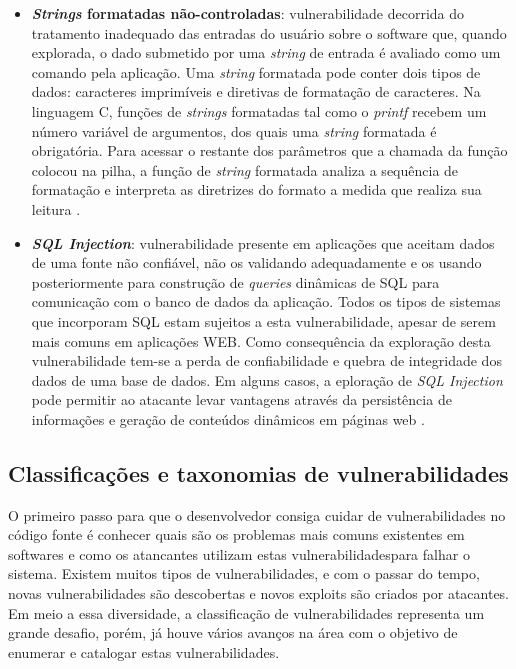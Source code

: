 \begin{itemize}
\item \textbf{\emph{Strings} formatadas não-controladas}: vulnerabilidade decorrida do tratamento inadequado das entradas do usuário sobre o software que, quando explorada, o dado submetido por uma \emph{string} de entrada é avaliado como um comando pela aplicação. Uma \emph{string} formatada pode conter dois tipos de dados: caracteres imprimíveis e diretivas de formatação de caracteres. Na linguagem C, funções de \emph{strings} formatadas tal como o \emph{printf} recebem um número variável de argumentos, dos quais uma \emph{string}  formatada é obrigatória. Para acessar o restante dos parâmetros que a chamada da função colocou na pilha, a função de \emph{string} formatada analiza a sequência de formatação e interpreta as diretrizes do formato a medida que realiza sua leitura \cite{lhee2002}.
\item \textbf{\emph{SQL Injection}}: vulnerabilidade presente em aplicações que aceitam dados de uma fonte não confiável, não os validando adequadamente e os usando posteriormente para construção de \emph{queries} dinâmicas de SQL para comunicação com o banco de dados da aplicação. Todos os tipos de sistemas que incorporam SQL estam sujeitos a esta vulnerabilidade, apesar de serem mais comuns em aplicações WEB. Como consequência da exploração desta vulnerabilidade tem-se a perda de confiabilidade e quebra de integridade dos dados de uma base de dados. Em alguns casos, a eploração de \emph{SQL Injection} pode permitir ao atacante levar vantagens através da persistência de informações e geração de conteúdos dinâmicos em páginas web \cite{uscert2012}.
\end{itemize}

\subsection{Classificações e taxonomias de vulnerabilidades}
O primeiro passo para que o desenvolvedor consiga cuidar de vulnerabilidades no código fonte é conhecer quais são os problemas mais comuns existentes em softwares e como os atancantes utilizam estas vulnerabilidadespara falhar o sistema. Existem muitos tipos de vulnerabilidades, e com o passar do tempo, novas vulnerabilidades são descobertas e novos exploits são criados por atacantes. Em meio a essa diversidade, a classificação de vulnerabilidades representa um grande desafio, porém, já houve vários avanços na área com o objetivo de enumerar e catalogar estas vulnerabilidades.

